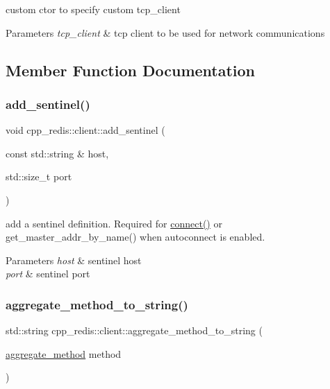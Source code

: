 custom ctor to specify custom tcp\+\_\+client


\begin{DoxyParams}{Parameters}
{\em tcp\+\_\+client} & tcp client to be used for network communications \\
\hline
\end{DoxyParams}


\subsection{Member Function Documentation}
\mbox{\label{classcpp__redis_1_1client_a7050eb52856decad9ab2060a139f4b48}} 
\subsubsection{\texorpdfstring{add\+\_\+sentinel()}{add\_sentinel()}}
{\footnotesize\ttfamily void cpp\+\_\+redis\+::client\+::add\+\_\+sentinel (\begin{DoxyParamCaption}\item[{const std\+::string \&}]{host,  }\item[{std\+::size\+\_\+t}]{port }\end{DoxyParamCaption})}

add a sentinel definition. Required for \hyperlink{classcpp__redis_1_1client_adda8b3e7b4f9c80ac052753b39178dd5}{connect()} or get\+\_\+master\+\_\+addr\+\_\+by\+\_\+name() when autoconnect is enabled.


\begin{DoxyParams}{Parameters}
{\em host} & sentinel host \\
\hline
{\em port} & sentinel port \\
\hline
\end{DoxyParams}
\mbox{\label{classcpp__redis_1_1client_ae0f65eac1bfea8711be4d2778d7c7697}} 
\subsubsection{\texorpdfstring{aggregate\+\_\+method\+\_\+to\+\_\+string()}{aggregate\_method\_to\_string()}}
{\footnotesize\ttfamily std\+::string cpp\+\_\+redis\+::client\+::aggregate\+\_\+method\+\_\+to\+\_\+string (\begin{DoxyParamCaption}\item[{\hyperlink{classcpp__redis_1_1client_aa197ca5b36da793c701d3ba388ec4946}{aggregate\+\_\+method}}]{method }\end{DoxyParamCaption})}


